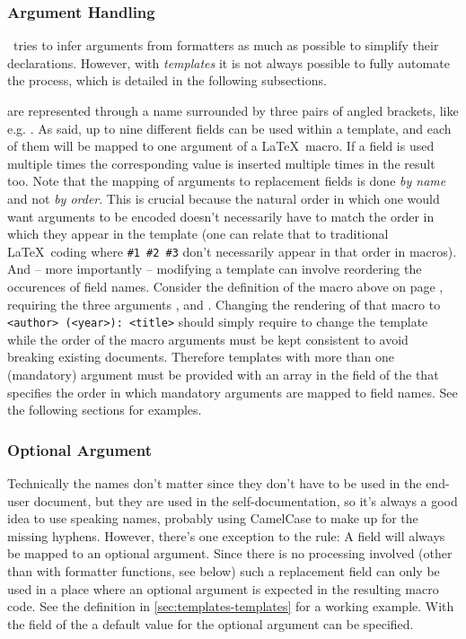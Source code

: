 \documentclass[12pt]{scrartcl}
\begin{document}
\subsubsection{Argument Handling}
\label{sec:templates-argument-handling}

\luatemplates\ tries to infer arguments from formatters as much as
possible to simplify their declarations.  However, with \emph{templates} it is
not always possible to fully automate the process, which is detailed in the
following subsections.

 are represented through a name
surrounded by three pairs of angled brackets, like e.g. . As
said, up to nine different fields can be used within a template, and each of
them will be mapped to one argument of a \LaTeX\ macro.  If a field is used
multiple times the corresponding value is inserted multiple times in the result
too. Note that the mapping of arguments to replacement fields is done \emph{by
name} and not \emph{by order}.  This is crucial because the natural order in
which one would want arguments to be encoded doesn't necessarily have to match
the order in which they appear in the template (one can relate that to
traditional \LaTeX\ coding where \texttt{\#1 \#2 \#3} don't necessarily appear
in that order in macros). And -- more importantly -- modifying a template can
involve reordering the occurences of field names. Consider the definition of the
 macro above on page \pageref{fig:bookShort}, requiring the three
arguments ,  and .  Changing the
rendering of that macro to \texttt{<author> (<year>): <title>} should simply
require to change the template while the order of the macro arguments must be
kept consistent to avoid breaking existing documents.  Therefore templates with
more than one (mandatory) argument must be provided with an array in the
 field of the  that specifies the order
in which mandatory arguments are mapped to field names.  See the following
sections for examples.


\subsubsection{Optional Argument}
\label{sec:defining:templates-optional-argument}

Technically the names don't matter since they don't have to be used in the
end-user document, but they are used in the self-documentation, so it's always a
good idea to use speaking names, probably using CamelCase to make up for the
missing hyphens.  However, there's one exception to the rule: A field
 will always be mapped to an optional argument.  Since
there is no processing involved (other than with formatter functions, see below)
such a replacement field can only be used in a place where an optional argument
is expected in the resulting macro code.  See the  definition in
\vref{sec:templates-templates} for a working example.  With the 
field of the  a default value for the optional
argument can be specified.
\end{document}
